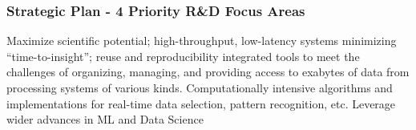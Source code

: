 \begin{frame}
\frametitle{Strategic Plan - 4 Priority R\&D Focus Areas}

\vskip 0.15in
 Maximize scientific potential; high-throughput, low-latency systems minimizing ``time-to-insight''; reuse and reproducibility integrated
\vskip 0.15in
 tools to meet the challenges of organizing, managing, and providing access to exabytes of data from processing systems of various kinds.
\vskip 0.15in
 Computationally intensive algorithms and implementations for real-time data selection, pattern recognition, etc.
\vskip 0.15in
 Leverage wider advances in ML and Data Science

\end{frame}


